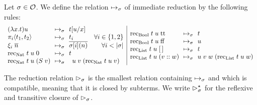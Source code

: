 \documentclass[a4paper,UKenglish,cleveref, autoref, thm-restate]{lipics-v2021}
\begin{document}
\begin{definition}[Reduction]
  Let $\sigma \in \mathcal O$.
  We define the relation $\mapsto_\sigma$ of immediate reduction by the following rules:
  \[\begin{array}{l@{~~}c@{~~}lr}
    (\lambda x.t)u & \rediE & t[u/x] \\
    \pi_i \langle t_1,t_2\rangle & \rediE & t_i & \forall i \in \{1,2\} \\
    \oracle_i\;\encode{n} & \rediE & \encode{\enviro[i](n)} & \forall i < |\enviro|\\
    \rec_{\Nat}\;t\;u\;\lamZ & \rediE & t \\
    \rec_{\Nat}\;t\;u\;(\lamS\;v) & \rediE & \multicolumn{2}{l}{u\;v\;(\rec_{\Nat}\;t\;u\;v) }\\

  \end{array}
  \vline
  \begin{array}{l@{~~}c@{~~}l}
    \rec_{\Bool}\;t\;u\;\rtt & \rediE & t \\
    \rec_{\Bool}\;t\;u\;\rff & \rediE &u \\
    \rec_{\List}\;t\;u\;\nil & \rediE &t \\
    \rec_{\List}\;t\;u\;(v \append w) & \rediE &u\;v\;w\;(\rec_{\List}\;t\;u\;w) \\
  \end{array}\]

  The reduction relation $\rhd_{\sigma}$ is the smallest relation containing $\mapsto_{\sigma}$ and which is compatible, meaning that it is closed by subterms. We write $\rhd^{\star}_{\sigma}$ for the reflexive and transitive closure of $\rhd_{\sigma}$.
\end{definition}
\end{document}
